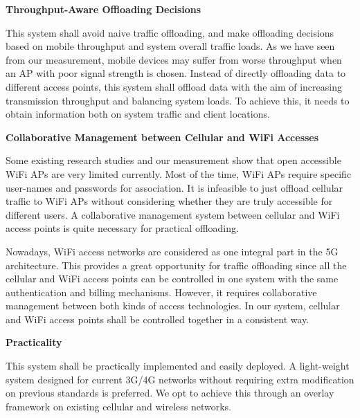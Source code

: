 \documentclass[english]{tktltiki}
\begin{document}
\vspace{1mm}

\textbf{Throughput-Aware Offloading Decisions}

\vspace{1mm}

This system shall avoid naive traffic offloading, and make offloading decisions based on mobile throughput and system overall traffic loads. As we have seen from our measurement, mobile devices may suffer from worse throughput when an AP with poor signal strength is chosen. Instead of directly offloading data to different access points, this system shall offload data with the aim of increasing transmission throughput and balancing system loads. To achieve this, it needs to obtain information both on system traffic and client locations.

\vspace{1mm}

\textbf{Collaborative Management between Cellular and WiFi Accesses}

\vspace{1mm}

Some existing research studies \cite{dhx+13} and our measurement show that open accessible WiFi APs are very limited currently. Most of the time, WiFi APs require specific user-names and passwords for association. It is infeasible to just offload cellular traffic to WiFi APs without considering whether they are truly accessible for different users. A collaborative management system between cellular and WiFi access points is quite necessary for practical offloading.

Nowadays, WiFi access networks are considered as one integral part in the 5G architecture. This provides a great opportunity for traffic offloading since all the cellular and WiFi access points can be controlled in one system with the same authentication and billing mechanisms. However, it requires collaborative management between both kinds of access technologies. In our system, cellular and WiFi access points shall be controlled together in a consistent way.

\vspace{1mm}

\textbf{Practicality}

\vspace{1mm}

This system shall be practically implemented and easily deployed. A light-weight system designed for current 3G/4G networks without requiring extra modification on previous standards is preferred. We opt to achieve this through an overlay framework on existing cellular and wireless networks.
\end{document}
